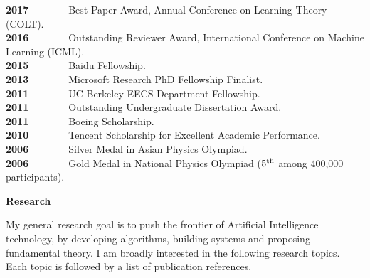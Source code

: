 \documentclass{res} %
\begin{document}
\begin{resume}
\vspace{-5pt}
\textbf{2017}~~~~~~~~Best Paper Award, Annual Conference on Learning Theory (COLT).\\
\textbf{2016}~~~~~~~~Outstanding Reviewer Award, International Conference on Machine Learning (ICML).\\
\textbf{2015}~~~~~~~~Baidu Fellowship.\\
\textbf{2013}~~~~~~~~Microsoft Research PhD Fellowship Finalist.\\
\textbf{2011}~~~~~~~~UC Berkeley EECS Department Fellowship.\\
\textbf{2011}~~~~~~~~Outstanding Undergraduate Dissertation Award.\\
\textbf{2011}~~~~~~~~Boeing Scholarship.\\
\textbf{2010}~~~~~~~~Tencent Scholarship for Excellent Academic Performance.\\
\textbf{2006}~~~~~~~~Silver Medal in Asian Physics Olympiad.\\
\textbf{2006}~~~~~~~~Gold Medal in National Physics Olympiad ($5^{\rm{th}}$ among 400,000 participants).

{\bf\Large Research}

My general research goal is to push the frontier of Artificial Intelligence technology, by developing algorithms, building systems and proposing fundamental theory. I am broadly interested in the following research topics. Each topic is followed by a list of publication references.


\end{resume}
\end{document}

